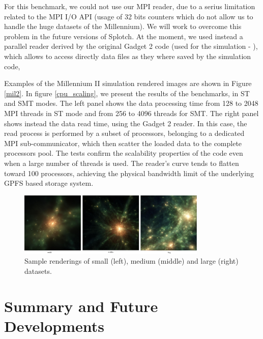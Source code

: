 For this benchmark, we could not use our MPI reader, due to a serius limitation related 
to the MPI I/O API (usage of 32 bits counters which do not allow us to handle the huge datasets of the Millennium).
We will work to overcome this problem in the future versions of Splotch. 
At the moment, we used instead a parallel reader derived by the original Gadget 2 code 
(used for the simulation - \cite{gadget}), 
which allows to access directly data files as they where saved by the simulation code, 

Examples of the Millennium II simulation rendered images are shown in Figure \ref{mil2}.
In figure \ref{cpu_scaling}, we present the results of the benchmarks, in ST and SMT modes.
The left panel shows the data processing time from 128 to 2048 MPI threads in ST mode and from
256 to 4096 threads for SMT. The right panel shows instead the data read time, using 
the Gadget 2 reader. In this case, the read process is performed by a subset of processors,
belonging to a dedicated MPI sub-communicator, which then scatter the loaded data to the complete
processors pool. The tests confirm the scalability properties of the code even when a large number
of threads is used. The reader's curve tends to flatten toward 100 processors, achieving 
the physical bandwidth limit of the underlying GPFS based storage system. 

\begin{figure}
\begin{center}
\includegraphics[width=0.8\textwidth]{cu_images.png}
\end{center}
\caption{Sample renderings of small (left), medium (middle) and large (right) datasets.}\label{cudafig}
\end{figure}

\section{Summary and Future Developments}
\label{conclusions}

